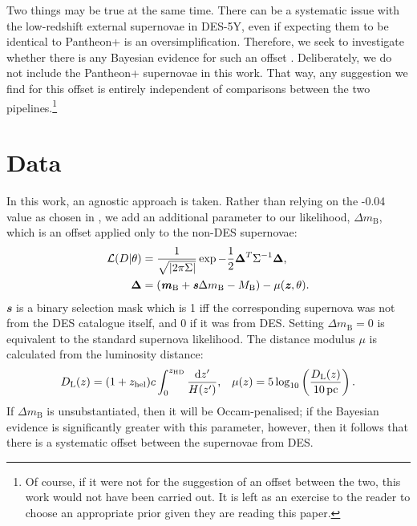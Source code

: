 \documentclass[fleqn,usenatbib]{mnras}
\newcommand{\dmb}{\ensuremath{\Delta m_\mathrm B}}
\begin{document}
    Two things may be true at the same time. There can be a systematic issue with the low-redshift external supernovae in DES-5Y, even if expecting them to be identical to Pantheon+ is an oversimplification.
    Therefore, we seek to investigate whether there is any Bayesian evidence for such an offset \citep{bayes1763essay}.
    Deliberately, we do not include the Pantheon+ supernovae in this work.
    That way, any suggestion we find for this offset is entirely independent of comparisons between the two pipelines.\footnote{Of course, if it were not for the suggestion of an offset between the two, this work would not have been carried out. It is left as an exercise to the reader to choose an appropriate prior given they are reading this paper.}

    \section{Data}\label{sec:data}

    In this work, an agnostic approach is taken.
    Rather than relying on the -0.04 value as chosen in \citet{georgedes5y}, we add an additional parameter to our likelihood, \dmb{}, which is an offset applied only to the non-DES supernovae:
    \begin{equation}
        \begin{aligned}
            \mathcal L(D | \theta) &= \frac{1}{\sqrt{|2\pi\Sigma|}}\exp - \frac 1 2 \mathbf{\Delta}^T\Sigma^{-1}\mathbf{\Delta}\text,\\
            \mathbf{\Delta} &= (\mathbfit m_\mathrm B + \mathbfit s\dmb{} - M_\mathrm B) - \mu(\mathbfit z, \theta)\text.\\
        \end{aligned}
    \end{equation}
    $\mathbfit s$ is a binary selection mask which is 1 iff the corresponding supernova was not from the DES catalogue itself, and 0 if it was from DES.
    Setting $\dmb=0$ is equivalent to the standard supernova likelihood.
    The distance modulus $\mu$ is calculated from the luminosity distance:
    \begin{equation}
        D_\mathrm L(z) = (1+z_\mathrm{hel})c\int_0^{z_\mathrm{HD}}\frac{\mathrm dz'}{H(z')}\text{,} \quad \mu(z) = 5\log_{10}\left(\frac{D_\mathrm L(z)}{\SI{10}{pc}}\right) \text.
    \end{equation}
    If \dmb{} is unsubstantiated, then it will be Occam-penalised; if the Bayesian evidence is significantly greater with this parameter, however, then it follows that there is a systematic offset between the supernovae from DES.
\end{document}
